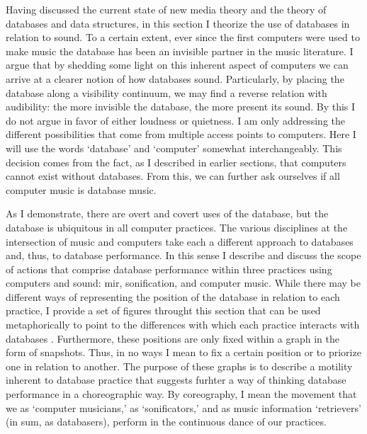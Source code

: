 
Having discussed the current state of new media theory and the theory of databases and data structures, in this section I theorize the use of databases in relation to sound. To a certain extent, ever since the first computers were used to make music the database has been an invisible partner in the music literature. I argue that by shedding some light on this inherent aspect of computers we can arrive at a clearer notion of how databases sound. Particularly, by placing the database along a visibility continuum, we may find a reverse relation with audibility: the more invisible the database, the more present its sound. By this I do not argue in favor of either loudness or quietness. I am only addressing the different possibilities that come from multiple access points to computers. Here I will use the words `database' and `computer' somewhat interchangeably. This decision comes from the fact, as I described in earlier sections, that computers cannot exist without databases. From this, we can further ask ourselves if all computer music is database music. 

As I demonstrate, there are overt and covert uses of the database, but the database is ubiquitous in all computer practices. The various disciplines at the intersection of music and computers take each a different approach to databases and, thus, to database performance. In this sense I describe and discuss the scope of actions that comprise database performance within three practices using computers and sound: \gls{mir}, sonification, and computer music. While there may be different ways of representing the position of the database in relation to each practice, I provide a set of figures throught this section that can be used metaphorically to point to the differences with which each practice interacts with databases . Furthermore, these positions are only fixed within a graph in the form of snapshots. Thus, in no ways I mean to fix a certain position or to priorize one in relation to another. The purpose of these graphs is to describe a motility inherent to database practice that suggests furhter a way of thinking database performance in a choreographic way. By coreography, I mean the movement that we as `computer musicians,' as `sonificators,' and as music information `retrievers' (in sum, as databasers), perform in the continuous dance of our practices. 